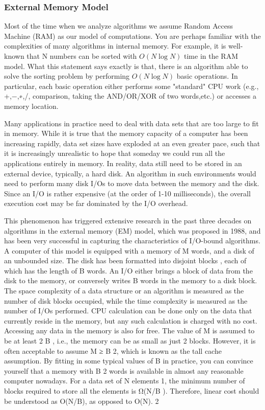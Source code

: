 \documentclass[12pt,a4paper]{book}
\begin{document}
\subsubsection{External Memory Model}
Most of the time when we analyze algorithms we assume Random Access Machine (RAM) as our model of computations. You are perhaps familiar with the complexities of many algorithms in internal memory.  For example, it is well-known that N numbers can be sorted with $O(N \log {N})$ time in the
RAM model. What this statement says exactly is that, there is an algorithm able to solve the sorting problem by performing $O(N \log {N})$ basic operations.  In particular, each basic operation either performs some "standard" CPU work (e.g., +,−,∗,/, comparison, taking the AND/OR/XOR of two words,etc.) or accesses a memory location.
\par 
Many applications in practice need to deal with data sets that are too large to fit in memory. While it is true that the memory capacity of a computer has been increasing rapidly, data set sizes have exploded at an even greater pace, such that it is increasingly unrealistic to hope that someday we could run all the applications entirely in memory.  In reality, data still need to be stored in an external device, typically, a hard disk.  An algorithm in such environments would need to perform many disk I/Os to move data between the memory and the disk.  Since an I/O is rather expensive (at the order of 1-10 milliseconds),  the overall execution cost may be far dominated by the I/O overhead.
\par
This phenomenon has triggered extensive research in the past three decades on algorithms in
the external memory (EM) model, which was proposed in 1988, and has been very successful in
capturing the characteristics of I/O-bound algorithms.  A computer of this model is equipped with a memory of M words, and a disk of an unbounded size.  The disk has been formatted into disjoint blocks , each of which has the length of B words.  An I/O either brings a block of data from the disk to the memory, or conversely writes B
words in the memory to a disk block.  The space complexity of a data structure or an algorithm is measured as the number of disk blocks occupied, while the time complexity is measured as the number of I/Os performed.  CPU calculation can be done only on the data that currently reside in the memory, but any such calculation is charged with no cost. Accessing any data in the memory is also for free.
The value of M is assumed to be at least 2 B , i.e., the memory can be as small as just 2 blocks. However, it is often acceptable to assume M ≥ B 2, which is known as the tall cache assumption. By fitting in some typical values of B in practice, you can convince yourself that a memory with B 2 words is available in almost any reasonable computer nowadays.
For a data set of N elements 1, the minimum number of blocks required to store all the elements
is Ω(N/B ).  Therefore, linear cost should be understood as O(N/B), as opposed to O(N). 2
\end{document}
